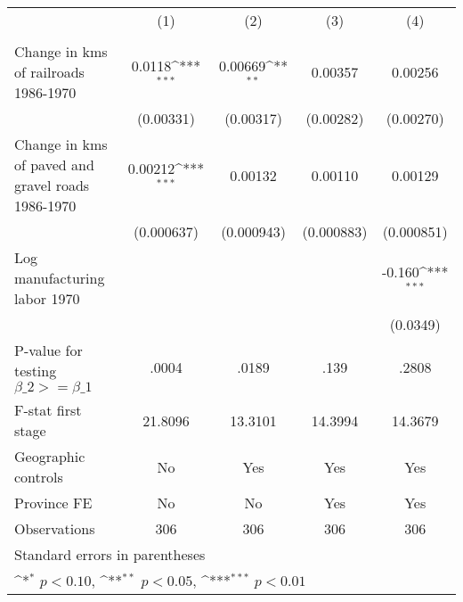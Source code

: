 {
\def\sym#1{\ifmmode^{#1}\else\(^{#1}\)\fi}
\begin{tabular}{l*{4}{c}}
\hline\hline
                &\multicolumn{1}{c}{(1)}&\multicolumn{1}{c}{(2)}&\multicolumn{1}{c}{(3)}&\multicolumn{1}{c}{(4)}\\
                &\multicolumn{1}{c}{}&\multicolumn{1}{c}{}&\multicolumn{1}{c}{}&\multicolumn{1}{c}{}\\
\hline
Change in kms of railroads 1986-1970&   0.0118\sym{***}&  0.00669\sym{**} &  0.00357         &  0.00256         \\
                &(0.00331)         &(0.00317)         &(0.00282)         &(0.00270)         \\
[1em]
Change in kms of paved and gravel roads 1986-1970&  0.00212\sym{***}&  0.00132         &  0.00110         &  0.00129         \\
                &(0.000637)         &(0.000943)         &(0.000883)         &(0.000851)         \\
[1em]
Log manufacturing labor 1970&                  &                  &                  &   -0.160\sym{***}\\
                &                  &                  &                  & (0.0349)         \\
\hline
P-value for testing $\beta\_{2} >= \beta\_{1}$&    .0004         &    .0189         &     .139         &    .2808         \\
F-stat first stage&  21.8096         &  13.3101         &  14.3994         &  14.3679         \\
Geographic controls&       No         &      Yes         &      Yes         &      Yes         \\
Province FE     &       No         &       No         &      Yes         &      Yes         \\
Observations    &      306         &      306         &      306         &      306         \\
\hline\hline
\multicolumn{5}{l}{\footnotesize Standard errors in parentheses}\\
\multicolumn{5}{l}{\footnotesize \sym{*} \(p<0.10\), \sym{**} \(p<0.05\), \sym{***} \(p<0.01\)}\\
\end{tabular}
}
